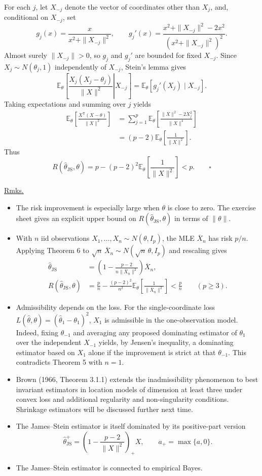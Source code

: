 \documentclass[11pt,a4paper]{article}
\begin{document}
For each $j$, let $X_{-j}$ denote the vector of coordinates other than
$X_j$, and, conditional on $X_{-j}$, set
\[
g_j(x)=\frac{x}{x^2+\|X_{-j}\|^2},
\qquad
g_j'(x)=\frac{x^2+\|X_{-j}\|^2-2x^2}{(x^2+\|X_{-j}\|^2)^2}.
\]
Almost surely $\|X_{-j}\|>0$, so $g_j$ and $g_j'$ are bounded for
fixed $X_{-j}$. Since $X_j\sim N(\theta_j,1)$ independently of
$X_{-j}$, Stein's lemma gives
\[
\mathbb E_\theta\left[\left.
  \frac{X_j(X_j-\theta_j)}{\|X\|^2}\right|X_{-j}\right]
=\mathbb E_\theta[g_j'(X_j)\mid X_{-j}].
\]
Taking expectations and summing over $j$ yields
\[
\begin{aligned}
\mathbb E_\theta\left[\frac{X^{\mathsf T}(X-\theta)}{\|X\|^2}\right]
&=\sum_{j=1}^p
  \mathbb E_\theta\left[\frac{\|X\|^2-2X_j^2}{\|X\|^4}\right]\\
&=(p-2)\mathbb E_\theta\left[\frac{1}{\|X\|^2}\right].
\end{aligned}
\]
Thus
\[
R(\hat\theta_{\mathrm{JS}},\theta)
=p-(p-2)^2\mathbb E_\theta\left[\frac{1}{\|X\|^2}\right]<p.
\qquad\square
\]

\medskip
\noindent\underline{Rmks.}
\begin{itemize}
\item The risk improvement is especially large when $\theta$ is close
to zero. The exercise sheet gives an explicit upper bound on
$R(\hat\theta_{\mathrm{JS}},\theta)$ in terms of $\|\theta\|$.
\item With $n$ iid observations $X_1,\ldots,X_n\sim N(\theta,I_p)$,
the MLE $\overline X_n$ has risk $p/n$. Applying Theorem 6 to
$\sqrt n\,\overline X_n\sim N(\sqrt n\,\theta,I_p)$ and rescaling gives
\[
\begin{aligned}
\hat\theta_{\mathrm{JS}}
&=\left(1-\frac{p-2}{n\|\overline X_n\|^2}\right)\overline X_n,\\
R(\hat\theta_{\mathrm{JS}},\theta)
&=\frac pn-\frac{(p-2)^2}{n^2}
  \mathbb E_\theta\left[\frac{1}{\|\overline X_n\|^2}\right]
<\frac pn \qquad (p\geq 3).
\end{aligned}
\]
\item Admissibility depends on the loss. For the single-coordinate loss
$L(\hat\theta,\theta)=(\hat\theta_1-\theta_1)^2$, $X_1$ is admissible
in the one-observation model. Indeed, fixing $\theta_{-1}$ and averaging
any proposed dominating estimator of $\theta_1$ over the independent
$X_{-1}$ yields, by Jensen's inequality, a dominating estimator based
on $X_1$ alone if the improvement is strict at that $\theta_{-1}$.
This contradicts Theorem 5 with $n=1$.
\item Brown (1966, Theorem 3.1.1) extends the inadmissibility phenomenon
to best invariant estimators in location models of dimension at least
three under convex loss and additional regularity and non-singularity
conditions. Shrinkage estimators will be discussed further next time.
\item The James--Stein estimator is itself dominated by its positive-part
version
\[
\hat\theta_{\mathrm{JS}}^+
=\left(1-\frac{p-2}{\|X\|^2}\right)_+X,
\qquad a_+=\max\{a,0\}.
\]
\item The James--Stein estimator is connected to empirical Bayes.
\end{itemize}
\end{document}
